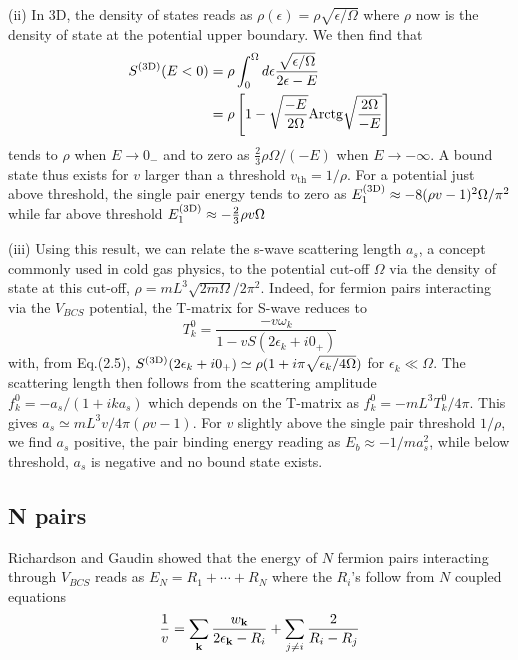 \documentclass[5p,twocolumn]{elsarticle}
\begin{document}
(ii) In 3D, the density of states reads as  
$\rho(\epsilon)=\rho\sqrt{\epsilon/\Omega}$
where $\rho$ now is the density of state at the potential upper boundary. We then find that
\begin{equation}
\begin{split}
S^{{\text{(3D)}}}(E<0)&=\rho\int_0^{\Omega}{}d\epsilon\frac{\sqrt{\epsilon/\Omega}}{2\epsilon-E}\\
	&=\rho\left[1-\sqrt{\frac{-E}{2\Omega}}\text{Arctg}\sqrt{\frac{2\Omega}{-E}}\right]
\end{split}
\end{equation}
tends to $\rho$ when $E\rightarrow0_-$ and to zero as $\frac{2}{3}\rho\Omega/(-E)$ when $E\rightarrow-\infty$. 
A bound state thus exists for $v$ larger than a threshold $v_{\text{th}}=1/\rho$.  For a potential just above threshold, the single pair energy tends to zero as 
$
E_1^{{\text{(3D)}}}\approx-8(\rho v-1)^2\Omega/\pi^2
$
while far above threshold
$E_1^{{\text{(3D)}}}\approx-\frac{2}{3}\rho{v}\Omega$

(iii) Using this result, we can relate the s-wave scattering length $a_{s}$, a concept commonly used in cold gas physics,  to the potential cut-off $\Omega$ via the density of state  at this cut-off, $\rho=mL^3\sqrt{2m\Omega}/2\pi^2$. Indeed, for fermion pairs interacting via the $V_{BCS}$ potential, the T-matrix for S-wave  reduces to
\begin{equation}
T^{0}_{k}=\frac{-v\omega_k}{1-vS(2\epsilon_k+i0_+)}
\end{equation}
with, from Eq.(2.5), $S^{{\text{(3D)}}}(2\epsilon_k+i0_+)\simeq\rho(1+i\pi\sqrt{\epsilon_k/4\Omega})$  for $\epsilon_k\ll\Omega$. The scattering length then follows from the scattering amplitude $f^0_k= -a_s/(1+ika_s)$ which depends on the T-matrix as $f^0_k= -mL^3T^{0}_{k}/4\pi$. This gives $a_s\simeq mL^3v/4\pi(\rho v-1)$. For $v$ slightly above the single pair threshold $1/\rho $, we find $a_s$ positive, the pair binding energy reading as $E_{b}\approx-1/ma_s^{2}$, while below threshold, $a_s$ is negative and no bound state exists. 

\subsection{N pairs\label{sec:NPair}}
Richardson \cite{Richardson1} and Gaudin \cite{gaudin} showed that the energy of $N$ fermion pairs interacting through $V_ {BCS}$ reads as $E_N=R_1+\cdots+R_N$ where the $R_i$'s follow from $N$ coupled equations
\begin{equation}
\frac{1}{v}=\sum_{\mathbf{k}}\frac{w_{\mathbf{k}}}{2\epsilon_{\mathbf{k}}-R_i}+\sum_{j\neq{}i}\frac{2}{R_i-R_j}
\end{equation}
\end{document}
